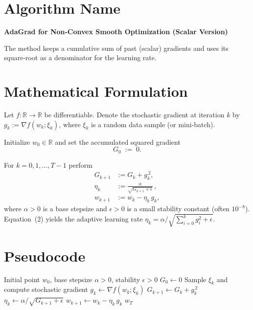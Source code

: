 \documentclass{article}
\begin{document}
\section*{Algorithm Name}
\textbf{AdaGrad for Non‑Convex Smooth Optimization (Scalar Version)}  

The method keeps a cumulative sum of past (scalar) gradients and uses its
square‑root as a denominator for the learning rate.

\section*{Mathematical Formulation}
Let $f:\mathbb{R}\rightarrow\mathbb{R}$ be differentiable.
Denote the stochastic gradient at iteration $k$ by $g_k:=\nabla f(w_k;\xi_k)$,
where $\xi_k$ is a random data sample (or mini‑batch).  

Initialize $w_0\in\mathbb{R}$ and set the accumulated squared gradient
\[
G_0 \;:=\; 0 .
\]

For $k=0,1,\dots,T-1$ perform
\begin{align}
G_{k+1} &:= G_k + g_k^{\,2}, \tag{1}\\[4pt]
\eta_{k} &:= \frac{\alpha}{\sqrt{G_{k+1}+\epsilon}}\,, \tag{2}\\[4pt]
w_{k+1} &:= w_k - \eta_{k}\, g_k , \tag{3}
\end{align}
where $\alpha>0$ is a base stepsize and $\epsilon>0$ is a small
stability constant (often $10^{-8}$).  
Equation~(2) yields the adaptive learning rate
$\eta_k = \alpha / \sqrt{\sum_{i=0}^{k} g_i^{2}+\epsilon}$.

\section*{Pseudocode}
\begin{algorithm}[H]
\caption{AdaGrad (scalar)}\label{alg:adagrad}
\begin{algorithmic}[1]
\Require Initial point $w_0$, base stepsize $\alpha>0$, stability $\epsilon>0$
\State $G_0 \gets 0$
    \State Sample $\xi_k$ and compute stochastic gradient $g_k \gets \nabla f(w_k;\xi_k)$
    \State $G_{k+1} \gets G_k + g_k^{\,2}$ 
    \State $\eta_k \gets \alpha / \sqrt{G_{k+1}+\epsilon}$ 
    \State $w_{k+1} \gets w_k - \eta_k\, g_k$ 
\EndFor
\State \Return $w_T$
\end{algorithmic}
\end{algorithm}
\end{document}
